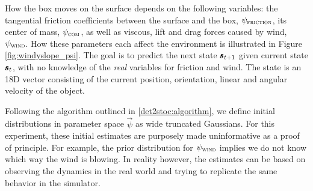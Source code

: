 How the box moves on the surface depends on the following variables: the tangential friction coefficients between the surface and the box, $\psi_{\textsc{friction}}$, its center of mass, $\psi_{\textsc{com}}$, as well as viscous, lift and drag forces caused by wind, $\psi_{\textsc{wind}}$. How these parameters each affect the environment is illustrated in Figure \ref{fig:windyslope_psi}. The goal is to predict the next state $\pmb{s}_{t+1}$ given current state $\pmb{s}_t$, with no knowledge of the \textit{real} variables for friction and wind. The state is an 18D vector consisting of the current position, orientation, linear and angular velocity of the object.

Following the \dettostoc{} algorithm outlined in \ref{det2stoc:algorithm}, we define initial distributions in parameter space $\vec{\psi}$ as wide truncated Gaussians. For this experiment, these initial estimates are purposely made uninformative as a proof of principle. For example, the prior distribution for $\psi_{\textsc{wind}}$ implies we do not know which way the wind is blowing. In reality however, the estimates can be based on observing the dynamics in the real world and trying to replicate the same behavior in the simulator.

